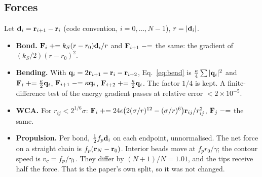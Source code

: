 \documentclass[11pt]{article}
\begin{document}
\subsection{Forces}
Let $\mathbf{d}_i=\mathbf{r}_{i+1}-\mathbf{r}_i$ (code convention, $i=0,\dots,N-1$), $r=|\mathbf{d}_i|$.
\begin{itemize}
\item \textbf{Bond.} $\mathbf{F}_i\mathrel{+}=k_S(r-r_0)\mathbf{d}_i/r$ and $\mathbf{F}_{i+1}\mathrel{-}=$ the same: the gradient of $(k_S/2)(r-r_0)^2$.
\item \textbf{Bending.} With $\mathbf{q}_i=2\mathbf{r}_{i+1}-\mathbf{r}_i-\mathbf{r}_{i+2}$, Eq.~\eqref{eq:bend} is $\frac\kappa4\sum|\mathbf{q}_i|^2$ and
$\mathbf{F}_i\mathrel{+}=\frac\kappa2\mathbf{q}_i$, $\mathbf{F}_{i+1}\mathrel{-}=\kappa\mathbf{q}_i$, $\mathbf{F}_{i+2}\mathrel{+}=\frac\kappa2\mathbf{q}_i$. The factor $1/4$ is kept. A finite-difference test of the energy gradient passes at relative error $<2\times10^{-5}$.
\item \textbf{WCA.} For $r_{ij}<2^{1/6}\sigma$: $\mathbf{F}_i\mathrel{+}=24\epsilon\big(2(\sigma/r)^{12}-(\sigma/r)^6\big)\mathbf{r}_{ij}/r_{ij}^2$, $\mathbf{F}_j\mathrel{-}=$ the same.
\item \textbf{Propulsion.} Per bond, $\frac12 f_p\mathbf{d}_i$ on each endpoint, unnormalised. The net force on a straight chain is $f_p(\mathbf{r}_N-\mathbf{r}_0)$.
Interior beads move at $f_pr_0/\gamma$; the contour speed is $v_c=f_p/\gamma_{l}$. They differ by $(N+1)/N=1.01$, and the tips receive half the force.
That is the paper's own split, so it was not changed.
\end{itemize}
\end{document}

